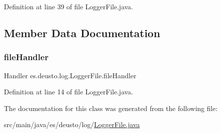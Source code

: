 Definition at line 39 of file Logger\+File.\+java.



\subsection{Member Data Documentation}
\mbox{\label{classes_1_1deusto_1_1log_1_1_logger_file_a9140523c75d641a5716eb51f175e9efa}} 
\subsubsection{\texorpdfstring{file\+Handler}{fileHandler}}
{\footnotesize\ttfamily Handler es.\+deusto.\+log.\+Logger\+File.\+file\+Handler}



Definition at line 14 of file Logger\+File.\+java.



The documentation for this class was generated from the following file\+:\begin{DoxyCompactItemize}
\item 
src/main/java/es/deusto/log/\hyperlink{_logger_file_8java}{Logger\+File.\+java}\end{DoxyCompactItemize}
